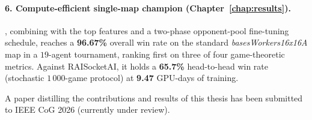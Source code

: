 \vspace*{-0.04cm}

\paragraph*{6. Compute-efficient single-map champion (Chapter~\ref{chap:results}).} , combining  with the top features and a two-phase opponent-pool fine-tuning schedule, reaches a \textbf{96.67\%} overall win rate on the standard \emph{basesWorkers16x16A} map in a $19$-agent tournament, ranking first on three of four game-theoretic metrics. Against RAISocketAI, it holds a \textbf{65.7\%} head-to-head win rate (stochastic $1\,000$-game protocol) at \textbf{9.47} GPU-days of training.

\vspace*{0.1cm}
A paper distilling the contributions and results of this thesis has been submitted to IEEE CoG 2026
(currently under review).